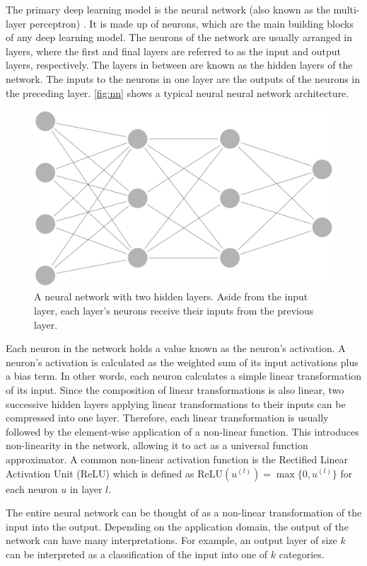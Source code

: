 The primary deep learning model is the neural network (also known as the multi-layer perceptron) \parencite{goodfellow2016deep}. It is made up of neurons, which are the main building blocks of any deep learning model. The neurons of the network are usually arranged in layers, where the first and final layers are referred to as the input and output layers, respectively. The layers in between are known as the hidden layers of the network. The inputs to the neurons in one layer are the outputs of the neurons in the preceding layer. \autoref{fig:nn} shows a typical neural neural network architecture.
\vspace{2 mm}
\begin{figure}[thbp]
    \centering
    \includegraphics[width=.5\linewidth]{figures/nn2.pdf}
    \caption{A neural network with two hidden layers. Aside from the input layer, each layer's neurons receive their inputs from the previous layer.}
    \label{fig:nn}
\end{figure}

Each neuron in the network holds a value known as the neuron's activation. A neuron's activation is calculated as the weighted sum of its input activations plus a bias term. In other words, each neuron calculates a simple linear transformation of its input. Since the composition of linear transformations is also linear, two successive hidden layers applying linear transformations to their inputs can be compressed into one layer. Therefore, each linear transformation is usually followed by the element-wise application of a non-linear function. This introduces non-linearity in the network, allowing it to act as a universal function approximator. A common non-linear activation function is the Rectified Linear Activation Unit (ReLU) which is defined as $\text{ReLU}(u^{(l)}) = \max\{ 0, u^{(l)}\}$
for each neuron $u$ in layer $l$.

The entire neural network can be thought of as a non-linear transformation of the input into the output. Depending on the application domain, the output of the network can have many interpretations. For example, an output layer of size $k$ can be interpreted as a classification of the input into one of $k$ categories.

